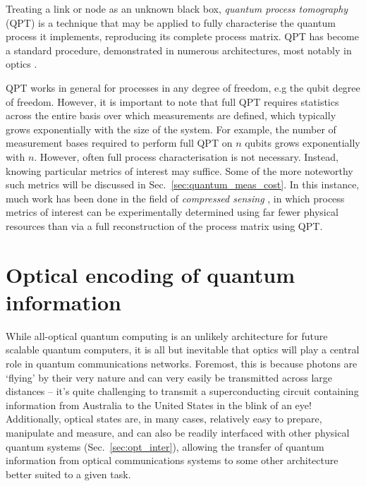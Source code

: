 \documentclass[aps,rmp,twocolumn,amsmath,amssymb,nofootinbib,superscriptaddress,longbibliography,floatfix]{revtex4-1}
\begin{document}
Treating a link or node as an unknown black box, \emph{quantum process tomography} (QPT) \cite{bib:ChuangNielsen97, ???} is a technique that may be applied to fully characterise the quantum process it implements, reproducing its complete process matrix. QPT has become a standard procedure, demonstrated in numerous architectures, most notably in optics \cite{bib:OBrien04, bib:RohdeGateChar05}.

QPT works in general for processes in any degree of freedom, e.g the qubit degree of freedom. However, it is important to note that full QPT requires statistics across the entire basis over which measurements are defined, which typically grows exponentially with the size of the system. For example, the number of measurement bases required to perform full QPT on $n$ qubits grows exponentially with $n$. However, often full process characterisation is not necessary. Instead, knowing particular metrics of interest may suffice. Some of the more noteworthy such metrics will be discussed in Sec.~\ref{sec:quantum_meas_cost}. In this instance, much work has been done in the field of \emph{compressed sensing} \cite{??? compressed_sensing}, in which process metrics of interest can be experimentally determined using far fewer physical resources than via a full reconstruction of the process matrix using QPT.

%
%

\section{Optical encoding of quantum information} \label{sec:opt_enc_of_qi}

While all-optical quantum computing is an unlikely architecture for future scalable quantum computers, it is all but inevitable that optics will play a central role in quantum communications networks. Foremost, this is because photons are `flying' by their very nature and can very easily be transmitted across large distances -- it's quite challenging to transmit a superconducting circuit containing information from Australia to the United States in the blink of an eye! Additionally, optical states are, in many cases, relatively easy to prepare, manipulate and measure, and can also be readily interfaced with other physical quantum systems (Sec.~\ref{sec:opt_inter}), allowing the transfer of quantum information from optical communications systems to some other architecture better suited to a given task.
\end{document}
